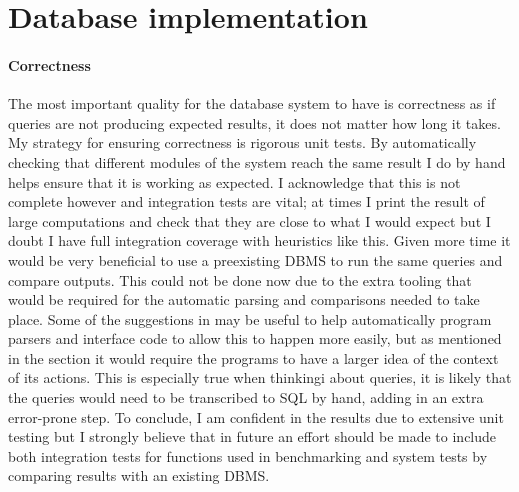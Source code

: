 \section{Database implementation} %
\paragraph{Correctness} The most important quality for the database system to
have is correctness as if queries are not producing expected results, it does
not matter how long it takes. My strategy for ensuring correctness is rigorous
unit tests. By automatically checking that different modules of the system reach
the same result I do by hand helps ensure that it is working as expected. I
acknowledge that this is not complete however and integration tests are vital;
at times I print the result of large computations and check that they are close
to what I would expect but I doubt I have full integration coverage with
heuristics like this. Given more time it would be very beneficial to use a
preexisting DBMS to run the same queries and compare outputs. This could not be
done now due to the extra tooling that would be required for the automatic
parsing and comparisons needed to take place. Some of the suggestions in
 may be useful to help automatically
program parsers and interface code to allow this to happen more easily, but as
mentioned in the section it would require the programs to have a larger idea of
the context of its actions. This is especially true when thinkingi about
queries, it is likely that the queries would need to be transcribed to SQL by
hand, adding in an extra error-prone step. To conclude, I am confident in the
results due to extensive unit testing but I strongly believe that in future an
effort should be made to include both integration tests for functions used in
benchmarking and system tests by comparing results with an existing DBMS.

